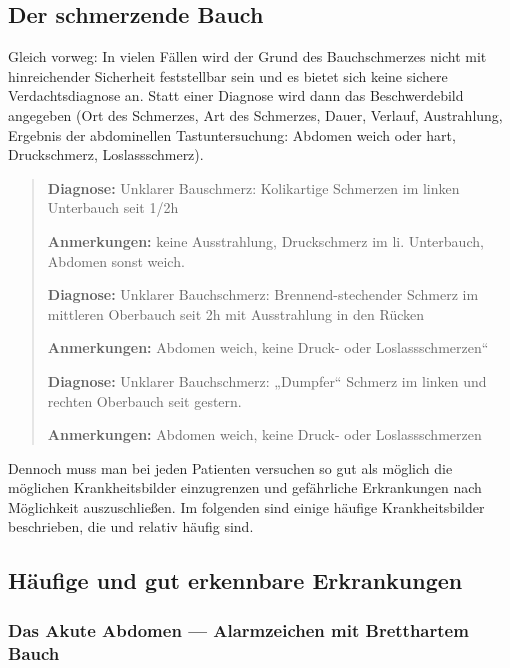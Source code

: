 \subsection{Der schmerzende Bauch}

Gleich vorweg: In vielen
Fällen wird der Grund des Bauchschmerzes nicht mit
hinreichender Sicherheit feststellbar sein und es bietet sich
keine sichere Verdachtsdiagnose an. Statt einer Diagnose wird
dann das Beschwerdebild angegeben (Ort des Schmerzes, Art des
Schmerzes, Dauer, Verlauf, Austrahlung, Ergebnis der
abdominellen Tastuntersuchung: Abdomen weich oder hart,
Druckschmerz, Loslassschmerz).


\begin{quote}
{\sffamily\bfseries Diagnose:} {\ttfamily Unklarer
Bauschmerz: Kolikartige Schmerzen im linken Unterbauch seit 1/2h }

{\sffamily\bfseries Anmerkungen:} {\ttfamily keine Ausstrahlung, Druckschmerz im li. Unterbauch, Abdomen sonst  weich.}
\vspace{0.5em}

{\sffamily\bfseries Diagnose:} {\ttfamily Unklarer
Bauchschmerz: Brennend-stechender Schmerz im mittleren
Oberbauch seit 2h mit Ausstrahlung in den Rücken}

{\sffamily\bfseries Anmerkungen:} {\ttfamily Abdomen weich,
keine Druck- oder Loslassschmerzen“}
\vspace{0.5em}

{\sffamily\bfseries Diagnose:} {\ttfamily Unklarer
Bauchschmerz: „Dumpfer“ Schmerz im linken und rechten
Oberbauch seit gestern. }

{\sffamily\bfseries Anmerkungen:} {\ttfamily Abdomen
weich, keine Druck- oder Loslassschmerzen}
\end{quote}

Dennoch muss man bei jeden Patienten versuchen so gut als
möglich die möglichen Krankheitsbilder einzugrenzen und
gefährliche Erkrankungen nach Möglichkeit auszuschließen. Im
folgenden sind einige häufige Krankheitsbilder beschrieben,
die   und relativ häufig sind.

\subsection{Häufige und gut erkennbare Erkrankungen}

\subsubsection{Das Akute Abdomen --- Alarmzeichen mit Bretthartem
Bauch}\label{topic:akutes-abdomen}



